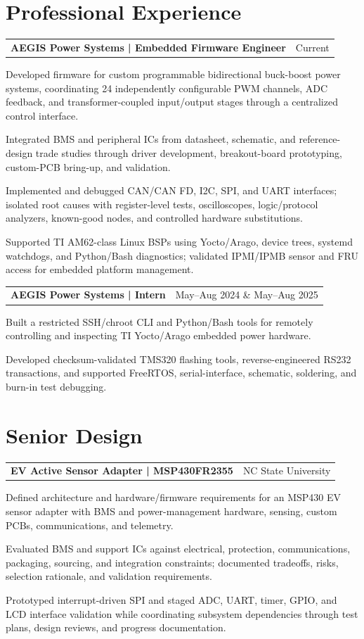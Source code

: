 \documentclass[10pt,letterpaper]{article}
\makeatletter
\newcommand{\resumeentry}[3]{%
  \begin{tabularx}{\textwidth}{@{}Xr@{}}
    \textbf{#1} & #2
  \end{tabularx}\vspace{-0.06cm}
  #3
}
\makeatother
\begin{document}
\section{Professional Experience}
\resumeentry{AEGIS Power Systems | Embedded Firmware Engineer}{Current}{
\begin{resumebullets}
  \item Developed firmware for custom programmable bidirectional buck-boost power systems, coordinating 24 independently configurable PWM channels, ADC feedback, and transformer-coupled input/output stages through a centralized control interface.
  \item Integrated BMS and peripheral ICs from datasheet, schematic, and reference-design trade studies through driver development, breakout-board prototyping, custom-PCB bring-up, and validation.
  \item Implemented and debugged CAN/CAN FD, I2C, SPI, and UART interfaces; isolated root causes with register-level tests, oscilloscopes, logic/protocol analyzers, known-good nodes, and controlled hardware substitutions.
  \item Supported TI AM62-class Linux BSPs using Yocto/Arago, device trees, systemd watchdogs, and Python/Bash diagnostics; validated IPMI/IPMB sensor and FRU access for embedded platform management.
\end{resumebullets}}

\resumeentry{AEGIS Power Systems | Intern}{May--Aug 2024 \& May--Aug 2025}{
\begin{resumebullets}
  \item Built a restricted SSH/chroot CLI and Python/Bash tools for remotely controlling and inspecting TI Yocto/Arago embedded power hardware.
  \item Developed checksum-validated TMS320 flashing tools, reverse-engineered RS232 transactions, and supported FreeRTOS, serial-interface, schematic, soldering, and burn-in test debugging.
\end{resumebullets}}

\section{Senior Design}
\resumeentry{EV Active Sensor Adapter | MSP430FR2355}{NC State University}{
\begin{resumebullets}
  \item Defined architecture and hardware/firmware requirements for an MSP430 EV sensor adapter with BMS and power-management hardware, sensing, custom PCBs, communications, and telemetry.
  \item Evaluated BMS and support ICs against electrical, protection, communications, packaging, sourcing, and integration constraints; documented tradeoffs, risks, selection rationale, and validation requirements.
  \item Prototyped interrupt-driven SPI and staged ADC, UART, timer, GPIO, and LCD interface validation while coordinating subsystem dependencies through test plans, design reviews, and progress documentation.
\end{resumebullets}}
\end{document}
